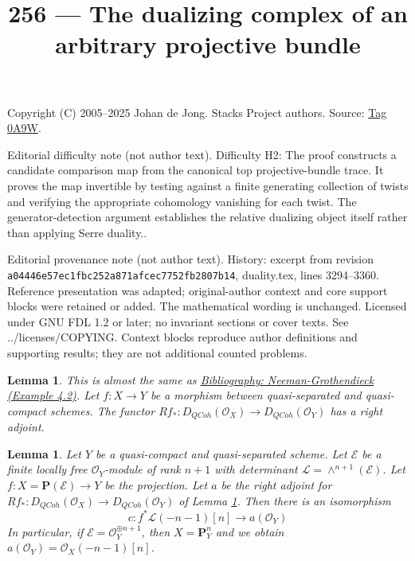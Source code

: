 \documentclass{amsart}
\newenvironment{reference}{\comment}{\endcomment}
\theoremstyle{plain}
\newtheorem{lemma}[subsection]{Lemma}
\theoremstyle{definition}
\theoremstyle{remark}
\numberwithin{equation}{subsection}
\def\QCoh{\mathit{QCoh}}
\begin{document}
\title[Stacks Project, Tag 0A9W]{256 --- The dualizing complex of an arbitrary projective bundle}
\maketitle
\noindent Copyright (C) 2005--2025 Johan de Jong. Stacks Project authors. Source: \href{https://stacks.math.columbia.edu/tag/0A9W}{Tag 0A9W}.

\noindent Editorial difficulty note (not author text). Difficulty H2: The proof constructs a candidate comparison map from the canonical top projective-bundle trace. It proves the map invertible by testing against a finite generating collection of twists and verifying the appropriate cohomology vanishing for each twist. The generator-detection argument establishes the relative dualizing object itself rather than applying Serre duality..

\noindent Editorial provenance note (not author text). History: excerpt from revision \texttt{a0444\allowbreak 6e57e\allowbreak c1fbc\allowbreak 252a8\allowbreak 71afc\allowbreak ec775\allowbreak 2fb28\allowbreak 07b14}, duality.tex, lines 3294--3360. Reference presentation was adapted; original-author context and core support blocks were retained or added. The mathematical wording is unchanged. Licensed under GNU FDL 1.2 or later; no invariant sections or cover texts. See ../licenses/COPYING. Context blocks reproduce author definitions and supporting results; they are not additional counted problems.

\begin{lemma}
\label{lemma-twisted-inverse-image}
\begin{reference}
This is almost the same as \href{https://stacks.math.columbia.edu/bibliography}{Bibliography: Neeman-Grothendieck (Example 4.2)}.
\end{reference}
Let $f : X \to Y$ be a morphism between quasi-separated and quasi-compact
schemes. The functor $Rf_* : D_\QCoh(\mathcal{O}_X) \to D_\QCoh(\mathcal{O}_Y)$
has a right adjoint.
\end{lemma}

\begin{lemma}
\label{lemma-upper-shriek-P1}
Let $Y$ be a quasi-compact and quasi-separated scheme.
Let $\mathcal{E}$ be a finite locally
free $\mathcal{O}_Y$-module of rank $n + 1$ with determinant
$\mathcal{L} = \wedge^{n + 1}(\mathcal{E})$.
Let $f : X = \mathbf{P}(\mathcal{E}) \to Y$ be the projection.
Let $a$ be the right adjoint for
$Rf_* : D_\QCoh(\mathcal{O}_X) \to D_\QCoh(\mathcal{O}_Y)$ of
Lemma \ref{lemma-twisted-inverse-image}.
Then there is an isomorphism
$$
c : f^*\mathcal{L}(-n - 1)[n] \longrightarrow a(\mathcal{O}_Y)
$$
In particular, if $\mathcal{E} = \mathcal{O}_Y^{\oplus n + 1}$, then
$X = \mathbf{P}^n_Y$ and we obtain
$a(\mathcal{O}_Y) = \mathcal{O}_X(-n - 1)[n]$.
\end{lemma}
\end{document}
